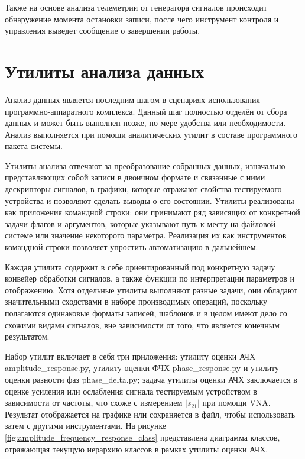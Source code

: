 \documentclass{report}
\begin{document}
Также на основе анализа телеметрии от генератора сигналов происходит обнаружение момента остановки записи, после чего инструмент контроля и управления выведет сообщение о завершении работы.

\section{Утилиты анализа данных}

Анализ данных является последним шагом в сценариях использования программно-аппаратного комплекса. Данный шаг полностью отделён от сбора данных и может быть выполнен позже, по мере удобства или необходимости. Анализ выполняется при помощи аналитических утилит в составе программного пакета системы.

Утилиты анализа отвечают за преобразование собранных данных, изначально представляющих собой записи в двоичном формате и связанные с ними дескрипторы сигналов, в графики, которые отражают свойства тестируемого устройства и позволяют сделать выводы о его состоянии. Утилиты реализованы как приложения командной строки: они принимают ряд зависящих от конкретной задачи флагов и аргументов, которые указывают путь к месту на файловой системе или значение некоторого параметра. Реализация их как инструментов командной строки позволяет упростить автоматизацию в дальнейшем.

Каждая утилита содержит в себе ориентированный под конкретную задачу конвейер обработки сигналов, а также функции по интерпретации параметров и отображению. Хотя отдельные утилиты выполняют разные задачи, они обладают значительными сходствами в наборе производимых операций, поскольку полагаются одинаковые форматы записей, шаблонов и в целом имеют дело со схожими видами сигналов, вне зависимости от того, что является конечным результатом.

Набор утилит включает в себя три приложения: утилиту оценки АЧХ amplitude\_response.py, утилиту оценки ФЧХ phase\_response.py и утилиту оценки разности фаз phase\_delta.py; задача утилиты оценки АЧХ заключается в оценке усиления или ослабления сигнала тестируемым устройством в зависимости от частоты, что схоже с измерением $|s_{21}|$ при помощи VNA. Результат отображается на графике или сохраняется в файл, чтобы использовать затем с другими инструментами. На рисунке \ref{fig:amplitude_frequency_response_class} представлена диаграмма классов, отражающая текущую иерархию классов в рамках утилиты оценки АЧХ.

\end{document}
